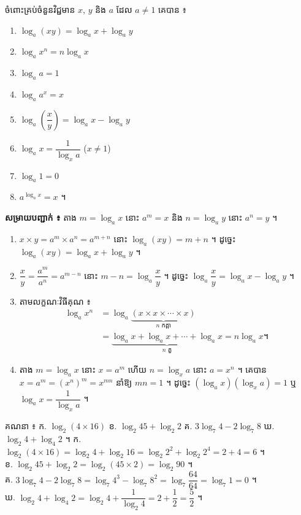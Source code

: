 \begin{theorem}[លក្ខណៈលោការីត]
ចំពោះគ្រប់ចំនួនវិជ្ជមាន $x$, $y$ និង $a$ ដែល $a \ne 1$ គេបាន ៖
\begin{enumerate}[1]
  \item $\log_a(xy) = \log_a x + \log_a y$
  \item $\log_a x^n = n\log_a x$
  \item $\log_a a = 1$
  \item $\log_a a^x = x$
  \item $\log_a\left(\dfrac{x}{y}\right) = \log_a x - \log_a y$
  \item $\log_a x = \dfrac{1}{\log_x a}$ \quad ($x \ne 1$)
  \item $\log_a 1 = 0$
  \item $a^{\log_a x} = x$ ។
\end{enumerate}
\end{theorem}

\textbf{សម្រាយបញ្ជាក់ ៖} តាង $m = \log_a x$ នោះ $a^m = x$ និង $n = \log_a y$ នោះ $a^n = y$ ។
\begin{enumerate}[1]
  \item $x\times y = a^m\times a^n = a^{m+n}$ នោះ $\log_a(xy) = m + n$ ។ ដូច្នេះ $\log_a(xy) = \log_a x + \log_a y$ ។
  \item $\dfrac{x}{y} = \dfrac{a^m}{a^n} = a^{m-n}$ នោះ $m - n = \log_a\dfrac{x}{y}$ ។ ដូច្នេះ $\log_a\dfrac{x}{y} = \log_a x - \log_a y$ ។
  \item តាមលក្ខណៈវិធីគុណ ៖
  \[
  \begin{aligned}
  \log_a x^n &= \log_a\underbrace{(x\times x\times\cdots\times x)}_{n \text{ កត្តា}}\\
  &= \underbrace{\log_a x + \log_a x + \cdots + \log_a x}_{n \text{ តួ}} = n\log_a x ។
  \end{aligned}
  \]
  \item តាង $m = \log_a x$ នោះ $x = a^m$ ហើយ $n = \log_x a$ នោះ $a = x^n$ ។ គេបាន $x = a^m = (x^n)^m = x^{mn}$ នាំឱ្យ $mn = 1$ ។ ដូច្នេះ $(\log_a x)(\log_x a) = 1$ ឬ $\log_a x = \dfrac{1}{\log_x a}$ ។
\end{enumerate}

\begin{example}[លំហាត់គំរូ ១]
គណនា ៖ \quad ក. $\log_2(4\times 16)$ \quad ខ. $\log_2 45 + \log_2 2$ \quad គ. $3\log_7 4 - 2\log_7 8$ \quad ឃ. $\log_2 4 + \log_4 2$ ។
\ans
ក. $\log_2(4\times 16) = \log_2 4 + \log_2 16 = \log_2 2^2 + \log_2 2^4 = 2 + 4 = 6$ ។\\
ខ. $\log_2 45 + \log_2 2 = \log_2(45\times 2) = \log_2 90$ ។\\
គ. $3\log_7 4 - 2\log_7 8 = \log_7 4^3 - \log_7 8^2 = \log_7\dfrac{64}{64} = \log_7 1 = 0$ ។\\
ឃ. $\log_2 4 + \log_4 2 = \log_2 4 + \dfrac{1}{\log_2 4} = 2 + \dfrac{1}{2} = \dfrac{5}{2}$ ។
\end{example}

